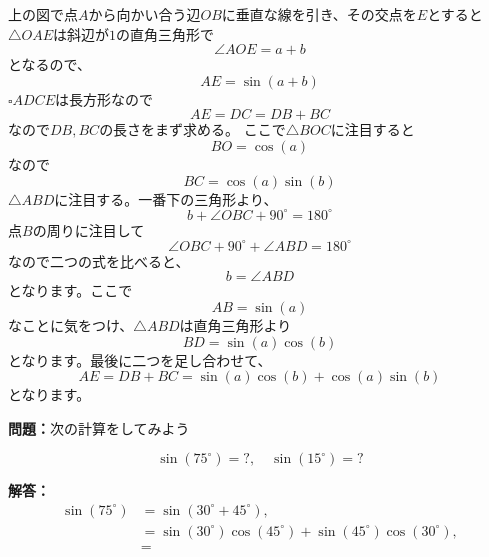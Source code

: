 \documentclass{ltjsarticle}
\begin{document}
上の図で点$A$から向かい合う辺$OB$に垂直な線を引き、その交点を$E$とすると$\triangle OAE$は斜辺が$1$の直角三角形で
\begin{equation*}
\angle AOE=a+b
\end{equation*}
となるので、
\begin{equation*}
AE = \sin(a+b)
\end{equation*}
$\square ADCE$は長方形なので
\begin{equation*}
AE = DC = DB+BC
\end{equation*}
なので$DB,BC$の長さをまず求める。
ここで$\triangle BOC$に注目すると
\begin{equation*}
BO = \cos(a)
\end{equation*}
なので
\begin{equation*}
BC = \cos(a)\sin(b)
\end{equation*}
$\triangle ABD$に注目する。一番下の三角形より、
\begin{equation*}
b+\angle OBC+90^\circ  = 180^\circ
\end{equation*}
点$B$の周りに注目して
\begin{equation*}
\angle OBC + 90^\circ + \angle ABD = 180^\circ
\end{equation*}
なので二つの式を比べると、
\begin{equation*}
b = \angle ABD
\end{equation*}
となります。ここで
\begin{equation*}
AB = \sin(a)
\end{equation*}
なことに気をつけ、$\triangle ABD$は直角三角形より
\begin{equation*}
BD = \sin(a)\cos(b)
\end{equation*}
となります。最後に二つを足し合わせて、
\begin{equation*}
AE = DB+BC = \sin(a)\cos(b)+\cos(a)\sin(b)
\end{equation*}
となります。
\par\textbf{問題：}次の計算をしてみよう

\begin{equation*}
\sin(75^\circ)=?,\quad \sin(15^\circ)=?
\end{equation*}
\par\textbf{解答：}\\
\begin{align*}
\sin(75^\circ)& = \sin(30^\circ+45^\circ),\\
& = \sin(30^\circ)\cos(45^\circ)+\sin(45^\circ)\cos(30^\circ),\\
& = 
\end{align*}
\end{document}
